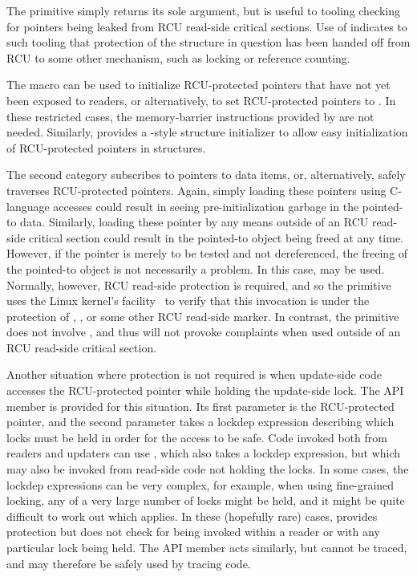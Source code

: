 The  primitive simply returns its sole argument,
but is useful to tooling checking for pointers being leaked from
RCU read-side critical sections.
Use of  indicates to such tooling that protection
of the structure in question has been handed off from RCU to some other
mechanism, such as locking or reference counting.

The  macro can be used to initialize RCU-protected
pointers that have not yet been exposed to readers, or alternatively,
to set RCU-protected pointers to .
In these restricted cases, the memory-barrier instructions provided by
 are not needed.
Similarly,  provides a \GCC-style
structure initializer to allow easy initialization of RCU-protected
pointers in structures.

The second category subscribes to pointers to data items, or,
alternatively, safely traverses RCU-protected pointers.
Again, simply loading these pointers using C-language accesses
could result in seeing pre-initialization garbage in the pointed-to data.
Similarly, loading these pointer by any means outside of an RCU
read-side critical section could result in the pointed-to object being
freed at any time.
However, if the pointer is merely to be tested and not dereferenced,
the freeing of the pointed-to object is not necessarily a problem.
In this case,  may be used.
Normally, however, RCU read-side protection is required, and so the
 primitive uses the Linux kernel's 
facility~\cite{JonathanCorbet2006lockdep} to verify that this
 invocation is under the protection of
, , or some other RCU read-side
marker.
In contrast, the  primitive does not involve
, and thus will not provoke  complaints when
used outside of an RCU read-side critical section.

Another situation where protection is not required is when update-side code
accesses the RCU-protected pointer while holding the update-side lock.
The  API member is provided for this
situation.
Its first parameter is the RCU-protected pointer, and the second
parameter takes a lockdep expression describing which locks must be
held in order for the access to be safe.
Code invoked both from readers and updaters can use
, which also takes a lockdep expression, but
which may also be invoked from read-side code not holding the locks.
In some cases, the lockdep expressions can be very complex, for example,
when using fine-grained locking, any of a very large number of locks
might be held, and it might be quite difficult to work out which applies.
In these (hopefully rare) cases,  provides
protection but does not check for being invoked within a reader or with
any particular lock being held.
The  API member acts similarly, but
cannot be traced, and may therefore be safely used by tracing code.


